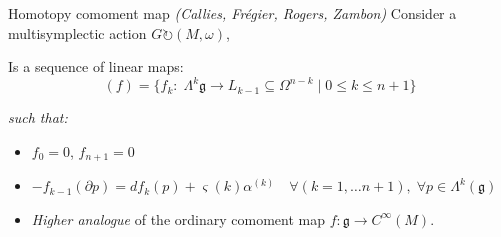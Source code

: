 \documentclass[beamer,10pt]{standalone}
\begin{document}
\begin{frame}[fragile,t]{Homotopy comoment map \emph{(Callies, Frégier, Rogers, Zambon)}}
		Consider a multisymplectic action $G \circlearrowright (M, \omega)$,
		\begin{defblock}				
			Is a sequence of linear maps:
			\begin{displaymath}
				(f)  = \big\lbrace f_k: \; \Lambda^k{\mathfrak g} \to L_{k-1} \subseteq \Omega^{n-k} 
				\;\big\vert\; 0\leq k \leq n+1  \big\rbrace
			\end{displaymath}
						
			\emph{such that:}
			\begin{itemize}
				\item $f_0 = 0 $, $f_{n+1} = 0$ %
				\item<2-> $-f_{k-1} (\partial p) = d f_k (p) + \varsigma(k) \alpha^{(k)} \quad \forall (k=1,\dots n+1), \; \forall p \in \Lambda^k(\mathfrak{g})$
			\end{itemize}
		\end{defblock}
		\begin{itemize}
			\item \emph{Higher analogue} of the ordinary comoment map $f\colon \mathfrak{g}\rightarrow C^\infty(M)$.
		\end{itemize}
  \end{frame}
\end{document}
